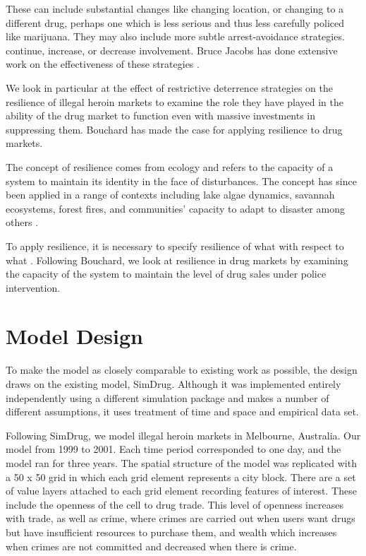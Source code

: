\documentclass[runningheads,a4paper]{llncs}
\begin{document}
These can include substantial changes like changing location, or changing to a different drug, perhaps one which is less serious and thus less carefully policed like marijuana. They may also include more subtle arrest-avoidance strategies.
continue, increase, or decrease involvement. Bruce Jacobs has done extensive work on the effectiveness of these strategies \cite{some of his papers}. %

We look in particular at the effect of restrictive deterrence strategies on the resilience of illegal heroin markets to examine the role they have played in the ability of the drug market to function even with massive investments in suppressing them. Bouchard has made the case for applying resilience to drug markets.

The concept of resilience comes from ecology and refers to the capacity of a system to maintain its identity in the face of disturbances. The concept has since been applied in a range of contexts including lake algae dynamics, savannah ecosystems, forest fires, and communities' capacity to adapt to disaster among others \cite{The resilience alliance maintains a database of examples}.


To apply resilience, it is necessary to specify resilience of what with respect to what \cite{Resilience of what with respect to what paper}.
Following Bouchard, we look at resilience in drug markets by examining the capacity of the system to maintain the level of drug sales under police intervention.


\section{Model Design}

To make the model as closely comparable to existing work as possible, the design draws on the existing model, SimDrug. Although it was implemented entirely independently using a different simulation package and makes a number of different assumptions, it uses treatment of time and space and empirical data set.


Following SimDrug, we model illegal heroin markets in Melbourne, Australia. Our model from 1999 to 2001. Each time period corresponded to one day, and the model ran for three years. The spatial structure of the model was replicated with a 50 x 50 grid in which each grid element represents a city block. There are a set of value layers attached to each grid element recording features of interest. These include the openness of the cell to drug trade. This level of openness increases with trade, as well as crime, where crimes are carried out when users want drugs but have insufficient resources to purchase them, and wealth which increases when crimes are not committed and decreased when there is crime.
\end{document}
